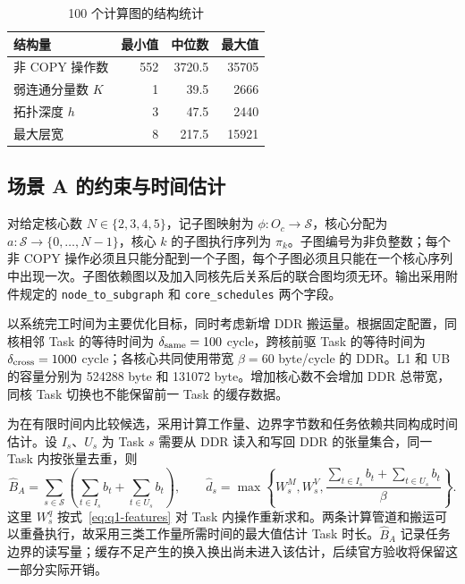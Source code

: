 \begin{table}[htbp]
\centering
\caption{100 个计算图的结构统计}
\label{tab:q1-structure}
\begin{tabular}{lrrr}
\hline
结构量 & 最小值 & 中位数 & 最大值 \\
\hline
非 COPY 操作数 & 552 & 3720.5 & 35705 \\
弱连通分量数 $K$ & 1 & 39.5 & 2666 \\
拓扑深度 $h$ & 3 & 47.5 & 2440 \\
最大层宽 & 8 & 217.5 & 15921 \\
\hline
\end{tabular}
\end{table}

\subsection{场景 A 的约束与时间估计}
对给定核心数 $N\in\{2,3,4,5\}$，记子图映射为 $\phi:O_c\to\mathcal S$，核心分配为 $a:\mathcal S\to\{0,\ldots,N-1\}$，核心 $k$ 的子图执行序列为 $\pi_k$。子图编号为非负整数；每个非 COPY 操作必须且只能分配到一个子图，每个子图必须且只能在一个核心序列中出现一次。子图依赖图以及加入同核先后关系后的联合图均须无环。输出采用附件规定的 \texttt{node\_to\_subgraph} 和 \texttt{core\_schedules} 两个字段。

以系统完工时间为主要优化目标，同时考虑新增 DDR 搬运量。根据固定配置，同核相邻 Task 的等待时间为 $\delta_{\rm same}=100$ cycle，跨核前驱 Task 的等待时间为 $\delta_{\rm cross}=1000$ cycle；各核心共同使用带宽 $\beta=60$ byte/cycle 的 DDR。L1 和 UB 的容量分别为 524288 byte 和 131072 byte。增加核心数不会增加 DDR 总带宽，同核 Task 切换也不能保留前一 Task 的缓存数据。

为在有限时间内比较候选，采用计算工作量、边界字节数和任务依赖共同构成时间估计。设 $I_s$、$U_s$ 为 Task $s$ 需要从 DDR 读入和写回 DDR 的张量集合，同一 Task 内按张量去重，则
\begin{equation}
\widehat B_A=\sum_{s\in\mathcal S}\left(\sum_{t\in I_s}b_t+\sum_{t\in U_s}b_t\right),\qquad
\widehat d_s=\max\left\{W_s^M,W_s^V,
\frac{\sum_{t\in I_s}b_t+\sum_{t\in U_s}b_t}{\beta}\right\}.
\label{eq:q1-duration}
\end{equation}
这里 $W_s^q$ 按式~\eqref{eq:q1-features} 对 Task 内操作重新求和。两条计算管道和搬运可以重叠执行，故采用三类工作量所需时间的最大值估计 Task 时长。$\widehat B_A$ 记录任务边界的读写量；缓存不足产生的换入换出尚未进入该估计，后续官方验收将保留这一部分实际开销。

